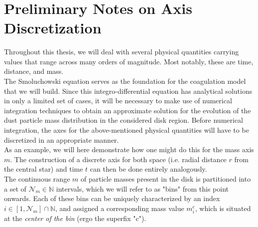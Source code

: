      \\
     \\
     \\
     \\
     \\


\clearpage\section{Preliminary Notes on Axis Discretization}

    Throughout this thesis, we will deal with several physical quantities carrying values that 
    range across many orders of magnitude. Most notably, these are time, distance, and mass. \\

    The Smoluchowski equation serves as the foundation for the coagulation model that we will 
    build. Since this integro-differential equation has analytical solutions in only a limited 
    set of cases, it will be necessary to make use of numerical integration techniques to obtain 
    an approximate solution for the evolution of the dust particle mass distribution in the 
    considered disk region. Before numerical integration, the axes for the above-mentioned 
    physical quantities will have to be discretized in an appropriate manner. \\

    As an example, we will here demonstrate how one might do this for the mass axis $m$. 
    The construction  of a discrete axis for both space (i.e. radial distance $r$ from the 
    central star) and time $t$ can then be done entirely analogously. \\

    The continuous range $m$ of particle masses present in the disk is partitioned into a set of 
    $\mathcal N_m\in\mathbb N$ intervals, which we will refer to as "bins" from this point onwards. 
    Each of these bins can be uniquely characterized by an index 
    $i\in[1,\mathcal N_m]\cap\mathbb N$, and assigned a corresponding mass value $m_i^\text{c}$, 
    which is situated at the \textit{center of the bin} (ergo the superfix "c").\\
    
